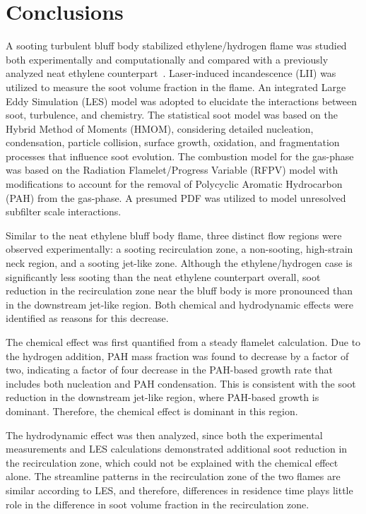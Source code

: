 \documentclass[review,3p,times]{elsarticle}
\begin{document}
\section{Conclusions}

A sooting turbulent bluff body stabilized ethylene/hydrogen flame was studied both experimentally and computationally and compared with a previously analyzed neat ethylene counterpart~\cite{mueller13}.  Laser-induced incandescence (LII) was utilized to measure the soot volume fraction in the flame.  An integrated Large Eddy Simulation (LES) model was adopted to elucidate the interactions between soot, turbulence, and chemistry.  The statistical soot model was based on the Hybrid Method of Moments (HMOM), considering detailed nucleation, condensation, particle collision, surface growth, oxidation, and fragmentation processes that influence soot evolution.  The combustion model for the gas-phase was based on the Radiation Flamelet/Progress Variable (RFPV) model with modifications to account for the removal of Polycyclic Aromatic Hydrocarbon (PAH) from the gas-phase.  A presumed PDF was utilized to model unresolved subfilter scale interactions.

Similar to the neat ethylene bluff body flame, three distinct flow regions were observed experimentally: a sooting recirculation zone, a non-sooting, high-strain neck region, and a sooting jet-like zone.  Although the ethylene/hydrogen case is significantly less sooting than the neat ethylene counterpart overall, soot reduction in the recirculation zone near the bluff body is more pronounced than in the downstream jet-like region.  Both chemical and hydrodynamic effects were identified as reasons for this decrease.

The chemical effect was first quantified from a steady flamelet calculation.  Due to the hydrogen addition, PAH mass fraction was found to decrease by a factor of two, indicating a factor of four decrease in the PAH-based growth rate that includes both nucleation and PAH condensation.  This is consistent with the soot reduction in the downstream jet-like region, where PAH-based growth is dominant.  Therefore, the chemical effect is dominant in this region.

The hydrodynamic effect was then analyzed, since both the experimental measurements and LES calculations demonstrated additional soot reduction in the recirculation zone, which could not be explained with the chemical effect alone.  The streamline patterns in the recirculation zone of the two flames are similar according to LES, and therefore, differences in residence time plays little role in the difference in soot volume fraction in the recirculation zone.  
\end{document}
